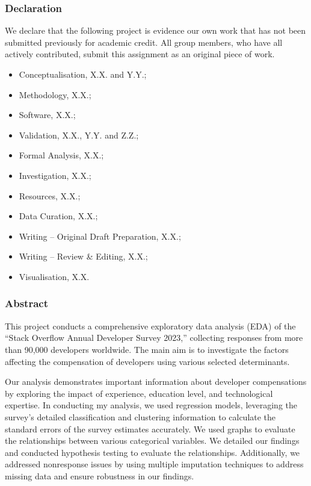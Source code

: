 \documentclass[
  12pt,
]{article}
\author{}
\date{\vspace{-2.5em}}
\providecommand{\tightlist}{%
  \setlength{\itemsep}{0pt}\setlength{\parskip}{0pt}}
\begin{document}
\hypertarget{declaration}{%
\subsubsection{Declaration}\label{declaration}}

We declare that the following project is evidence our own work that has
not been submitted previously for academic credit. All group members,
who have all actively contributed, submit this assignment as an original
piece of work.

\begin{itemize}
\tightlist
\item
  Conceptualisation, X.X. and Y.Y.;
\item
  Methodology, X.X.;
\item
  Software, X.X.;
\item
  Validation, X.X., Y.Y. and Z.Z.;
\item
  Formal Analysis, X.X.;
\item
  Investigation, X.X.;
\item
  Resources, X.X.;
\item
  Data Curation, X.X.;
\item
  Writing -- Original Draft Preparation, X.X.;
\item
  Writing -- Review \& Editing, X.X.;
\item
  Visualisation, X.X.
\end{itemize}

\hypertarget{abstract}{%
\subsubsection{Abstract}\label{abstract}}

This project conducts a comprehensive exploratory data analysis (EDA) of
the ``Stack Overflow Annual Developer Survey 2023,'' collecting
responses from more than 90,000 developers worldwide. The main aim is to
investigate the factors affecting the compensation of developers using
various selected determinants.

Our analysis demonstrates important information about developer
compensations by exploring the impact of experience, education level,
and technological expertise. In conducting my analysis, we used
regression models, leveraging the survey's detailed classification and
clustering information to calculate the standard errors of the survey
estimates accurately. We used graphs to evaluate the relationships
between various categorical variables. We detailed our findings and
conducted hypothesis testing to evaluate the relationships.
Additionally, we addressed nonresponse issues by using multiple
imputation techniques to address missing data and ensure robustness in
our findings.
\end{document}
